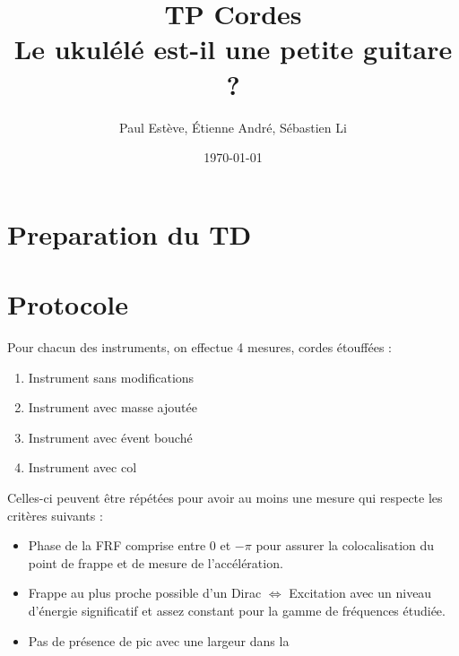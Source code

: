 \documentclass[atiam, article]{rapport} %
\title{TP Cordes\\Le ukulélé est-il une petite guitare ?}
\author{Paul Estève, Étienne André, Sébastien Li} %
\date{\today}
\begin{document}
\maketitle

\section{Preparation du TD}

\section{Protocole}

Pour chacun des instruments, on effectue 4 mesures, cordes étouffées :
\begin{enumerate}
    \item Instrument sans modifications
    \item Instrument avec masse ajoutée
    \item Instrument avec évent bouché
    \item Instrument avec col
\end{enumerate}

Celles-ci peuvent être répétées pour avoir au moins une mesure qui respecte les critères suivants :

\begin{itemize}
    \item Phase de la FRF comprise entre $0$ et $-\pi$ pour assurer la colocalisation du point de frappe et de mesure de l'accélération.
    \item Frappe au plus proche possible d'un Dirac $\Leftrightarrow$ Excitation avec un niveau d'énergie significatif et assez constant pour la gamme de fréquences étudiée.
    \item Pas de présence de pic avec une largeur dans la 
\end{itemize}
\end{document}
